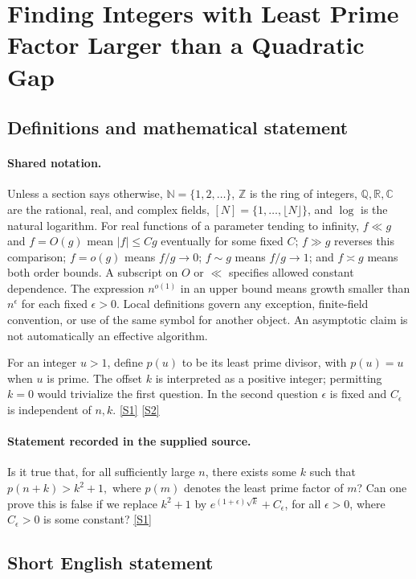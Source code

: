 \documentclass[11pt,a4paper]{article}
\newcommand{\N}{\mathbb{N}}
\newcommand{\Z}{\mathbb{Z}}
\newcommand{\Q}{\mathbb{Q}}
\newcommand{\R}{\mathbb{R}}
\newcommand{\C}{\mathbb{C}}
\newcommand{\sref}[2]{\hyperlink{source:#1:#2}{[S#2]}}
\begin{document}
\section{Finding Integers with Least Prime Factor Larger than a Quadratic Gap}\label{statement}


\subsection{Definitions and mathematical statement}

\paragraph{Shared notation.}Unless a section says otherwise, $\N=\{1,2,\ldots\}$,
$\Z$ is the ring of integers, $\Q,\R,\C$ are the rational, real, and complex
fields, $[N]=\{1,\ldots,\lfloor N\rfloor\}$, and $\log$ is the natural
logarithm. For real functions of a parameter tending to infinity,
$f\ll g$ and $f=O(g)$ mean $|f|\leq Cg$ eventually for some fixed $C$;
$f\gg g$ reverses this comparison; $f=o(g)$ means $f/g\to0$;
$f\sim g$ means $f/g\to1$; and $f\asymp g$ means both order bounds.
A subscript on $O$ or $\ll$ specifies allowed constant dependence.
The expression $n^{o(1)}$ in an upper bound means growth smaller than
$n^\epsilon$ for each fixed $\epsilon>0$. Local definitions govern any
exception, finite-field convention, or use of the same symbol for another
object. An asymptotic claim is not automatically an effective algorithm.



For an integer $u>1$, define $p(u)$ to be its least prime divisor, with $p(u)=u$ when $u$ is prime. The offset $k$ is interpreted as a positive integer; permitting $k=0$ would trivialize the first question. In the second question $\epsilon$ is fixed and $C_\epsilon$ is independent of $n,k$. \sref{statement}{1} \sref{statement}{2}

\paragraph{Statement recorded in the supplied source.}
Is it true that, for all sufficiently large $n$, there exists some $k$ such that $ p(n+k)>k^2+1, $ where $p(m)$ denotes the least prime factor of $m$?
Can one prove this is false if we replace $k^2+1$ by $e^{(1+\epsilon)\sqrt{k}}+C_\epsilon$, for all $\epsilon>0$, where $C_\epsilon>0$ is some constant? \sref{statement}{1}

\subsection{Short English statement}
\end{document}
